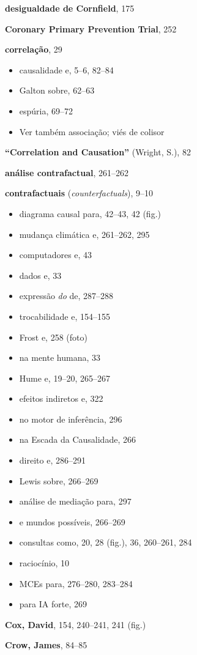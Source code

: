 \documentclass[11pt,a5paper,twoside]{book}
\begin{document}
\textbf{desigualdade de Cornfield}, 175

\textbf{Coronary Primary Prevention Trial}, 252

\textbf{correlação}, 29

\begin{itemize}
\item causalidade e, 5–6, 82–84
\item Galton sobre, 62–63
\item espúria, 69–72
\item Ver também associação; viés de colisor
\end{itemize}
\textbf{“Correlation and Causation”} (Wright, S.), 82

\textbf{análise contrafactual}, 261–262

\textbf{contrafactuais} (\textit{counterfactuals}), 9–10

\begin{itemize}
\item diagrama causal para, 42–43, 42 (fig.)
\item mudança climática e, 261–262, 295
\item computadores e, 43
\item dados e, 33
\item expressão \textit{do} de, 287–288
\item trocabilidade e, 154–155
\item Frost e, 258 (foto)
\item na mente humana, 33
\item Hume e, 19–20, 265–267
\item efeitos indiretos e, 322
\item no motor de inferência, 296
\item na Escada da Causalidade, 266
\item direito e, 286–291
\item Lewis sobre, 266–269
\item análise de mediação para, 297
\item e mundos possíveis, 266–269
\item consultas como, 20, 28 (fig.), 36, 260–261, 284
\item raciocínio, 10
\item MCEs para, 276–280, 283–284
\item para IA forte, 269
\end{itemize}
\textbf{Cox, David}, 154, 240–241, 241 (fig.)

\textbf{Crow, James}, 84–85
\end{document}
